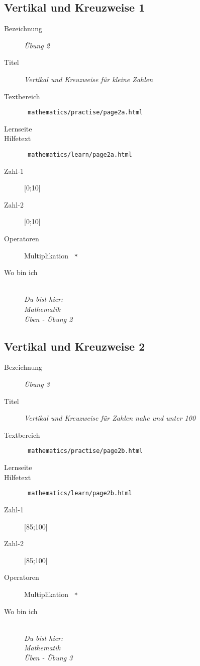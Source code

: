 \subsection{ Vertikal und Kreuzweise 1 }
\label{cha:math-practise-page2}
\begin{description}
  \item[Bezeichnung] \emph{ Übung 2 }
  \item[Titel] \emph{ Vertikal und Kreuzweise für kleine Zahlen }
  \item[Textbereich] \texttt{ mathematics/practise/page2a.html }
  \item[Lernseite] 
  \item[Hilfetext] \texttt{ mathematics/learn/page2a.html }
  \item[Zahl-1] [0;10]
  \item[Zahl-2] [0;10]
  \item[Operatoren] Multiplikation \texttt{ * }
  \item[Wo bin ich] \emph{\\Du bist hier:\\Mathematik\\Üben - Übung 2}
\end{description}



\subsection{ Vertikal und Kreuzweise 2 }
\label{cha:math-practise-page3}
\begin{description}
  \item[Bezeichnung] \emph{ Übung 3 }
  \item[Titel] \emph{ Vertikal und Kreuzweise für Zahlen nahe und unter 100 }
  \item[Textbereich] \texttt{ mathematics/practise/page2b.html }
  \item[Lernseite] 
  \item[Hilfetext] \texttt{ mathematics/learn/page2b.html }
  \item[Zahl-1] [85;100]
  \item[Zahl-2] [85;100]
  \item[Operatoren] Multiplikation \texttt{ * }
  \item[Wo bin ich] \emph{\\Du bist hier:\\Mathematik\\Üben - Übung 3}
\end{description}



